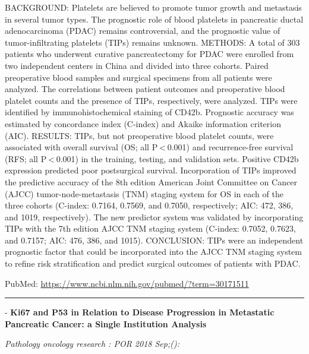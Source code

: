 \documentclass[]{article}
\begin{document}
BACKGROUND: Platelets are believed to promote tumor growth and
metastasis in several tumor types. The prognostic role of blood
platelets in pancreatic ductal adenocarcinoma (PDAC) remains
controversial, and the prognostic value of tumor-infiltrating platelets
(TIPs) remains unknown. METHODS: A total of 303 patients who underwent
curative pancreatectomy for PDAC were enrolled from two independent
centers in China and divided into three cohorts. Paired preoperative
blood samples and surgical specimens from all patients were analyzed.
The correlations between patient outcomes and preoperative blood
platelet counts and the presence of TIPs, respectively, were analyzed.
TIPs were identified by immunohistochemical staining of CD42b.
Prognostic accuracy was estimated by concordance index (C-index) and
Akaike information criterion (AIC). RESULTS: TIPs, but not preoperative
blood platelet counts, were associated with overall survival (OS; all
P \textless{} 0.001) and recurrence-free survival (RFS; all
P \textless{} 0.001) in the training, testing, and validation sets.
Positive CD42b expression predicted poor postsurgical survival.
Incorporation of TIPs improved the predictive accuracy of the 8th
edition American Joint Committee on Cancer (AJCC) tumor-node-metastasis
(TNM) staging system for OS in each of the three cohorts (C-index:
0.7164, 0.7569, and 0.7050, respectively; AIC: 472, 386, and 1019,
respectively). The new predictor system was validated by incorporating
TIPs with the 7th edition AJCC TNM staging system (C-index: 0.7052,
0.7623, and 0.7157; AIC: 476, 386, and 1015). CONCLUSION: TIPs were an
independent prognostic factor that could be incorporated into the AJCC
TNM staging system to refine risk stratification and predict surgical
outcomes of patients with PDAC.

PubMed: \url{https://www.ncbi.nlm.nih.gov/pubmed/?term=30171511}

{}

{}

\begin{center}\rule{0.5\linewidth}{\linethickness}\end{center}

 - \textbf{Ki67 and P53 in Relation to Disease Progression in Metastatic
Pancreatic Cancer: a Single Institution Analysis}

\emph{Pathology oncology research : POR 2018 Sep;():}
\end{document}
